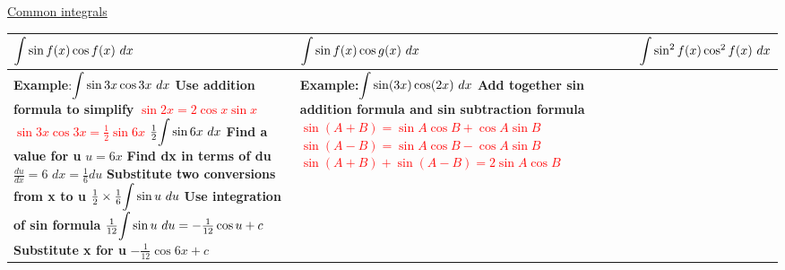 \documentclass{article}
\begin{document}
\begin{center}
\underline{\huge Common integrals}
\end{center}
\renewcommand{\arraystretch}{2}
\begin{tabularx}{\textwidth}{|X|X|X|}
\hline
$\mathlarger{\int}\sin f(x)\cos f(x) \ dx$&$\mathlarger{\int}\sin f(x)\cos g(x) \ dx$&$\mathlarger{\int}\sin^2f(x)\cos^2f(x) \ dx$\\
\hline
\textbf{Example}:$\mathlarger{\int}\sin 3x\cos 3x \ dx$\newline
\newline
\textbf{Use addition formula to simplify}\newline
\textcolor{red}{$\sin2x=2\cos x\sin x$}\newline
\textcolor{red}{$\sin3x\cos3x=\frac{1}{2}\sin6x$}\newline
$\frac{1}{2}\mathlarger{\int}\sin6x \ dx$\newline
\newline
\textbf{Find a value for u}\newline
$u=6x$\newline
\newline
\textbf{Find dx in terms of du}\newline
$\frac{du}{dx}=6$\newline
$dx=\frac{1}{6}du$\newline
\newline
\textbf{Substitute two conversions from x to u}\newline
$\frac{1}{2}\times\frac{1}{6}\mathlarger{\int}\sin u \ du$\newline
\newline
\textbf{Use integration of sin formula}\newline
$\frac{1}{12}\mathlarger{\int}\sin u \ du=-\frac{1}{12}\cos u +c$\newline
\newline
\textbf{Substitute x for u}\newline
$-\frac{1}{12}\cos6x+c$
&
\textbf{Example:}$\mathlarger{\int}\sin(3x)\cos(2x) \ dx$\newline
\newline
\textbf{Add together sin addition formula and sin subtraction formula}\newline
\textcolor{red}{$\sin(A+B)=\sin A\cos B+\cos A\sin B$}\newline
\textcolor{red}{$\sin(A-B)=\sin A\cos B-\cos A\sin B$}\newline
\textcolor{red}{$\sin(A+B)+\sin(A-B)=2\sin A\cos B$}\newline

\end{tabularx}
\end{document}

